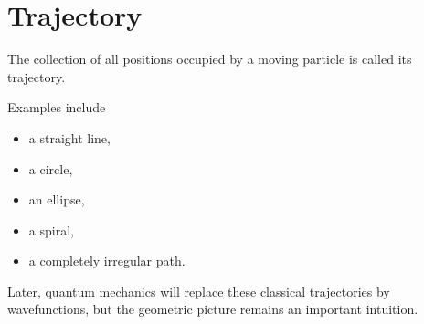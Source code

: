 \section{Trajectory}

The collection of all positions occupied by a moving particle is called its
trajectory.

Examples include

\begin{itemize}
	\item a straight line,
	\item a circle,
	\item an ellipse,
	\item a spiral,
	\item a completely irregular path.
\end{itemize}

Later, quantum mechanics will replace these classical trajectories by
wavefunctions, but the geometric picture remains an important intuition.

